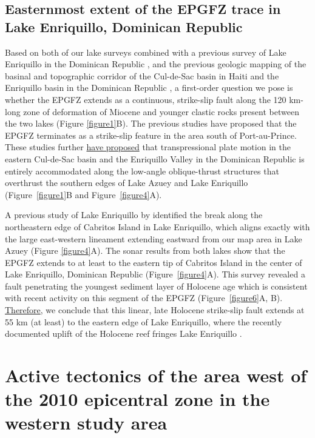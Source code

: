 \documentclass[linenumbers,draft]{agujournal}
\begin{document}
\subsection{Easternmost extent of the EPGFZ trace in Lake Enriquillo, Dominican Republic}
Based on both of our lake surveys combined with a previous survey of Lake Enriquillo in the Dominican Republic \citep{rios2013holocene}, and the previous geologic mapping of the basinal and topographic corridor of the Cul-de-Sac basin in Haiti and the Enriquillo basin in the Dominican Republic \citep{mann1995actively,mann1999caribbean}, a first-order question we pose is whether the EPGFZ extends as a continuous, strike-slip fault along the 120 km-long zone of deformation of Miocene and younger clastic rocks present between the two lakes (Figure \ref{figure1}B). The previous studies \citep{saint2015seismotectonics,symithe2016present} have proposed that the EPGFZ terminates as a strike-slip feature in the area south of Port-au-Prince. These studies further \ul{have proposed} that transpressional plate motion in the eastern Cul-de-Sac basin and the Enriquillo Valley in the Dominican Republic is entirely accommodated along the low-angle oblique-thrust structures that overthrust the southern edges of Lake Azuey and Lake Enriquillo (Figure~\ref{figure1}B and Figure~\ref{figure4}A). 

A previous study of Lake Enriquillo by \citet{rios2013holocene} identified the break along the northeastern edge of Cabritos Island in Lake Enriquillo, which aligns exactly with the large east-western lineament extending eastward from our map area in Lake Azuey (Figure \ref{figure4}A). The sonar results from both lakes show that the EPGFZ extends to at least to the eastern tip of Cabritos Island in the center of Lake Enriquillo, Dominican Republic \citep{mann1995actively} (Figure~\ref{figure4}A). This survey revealed a fault penetrating the youngest sediment layer of Holocene age which is consistent with recent activity on this segment of the EPGFZ (Figure~\ref{figure6}A, B). \ul{Therefore}, we conclude that this linear, late Holocene strike-slip fault extends at 55 km (at least) to the eastern edge of Lake Enriquillo, where the recently documented uplift of the Holocene reef fringes Lake Enriquillo \citep{mann1995actively}.

\section{Active tectonics of the area west of the 2010 epicentral zone in the western study area}
\end{document}
